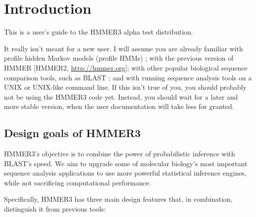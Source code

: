 \section{Introduction}

This is a user's guide to the HMMER3 alpha test distribution. 

It really isn't meant for a new user. I will assume you are already
familiar with profile hidden Markov models (profile HMMs)
\citep{Krogh94,Eddy98,Durbin98}; with the previous version of HMMER
[HMMER2, \url{http://hmmer.org}]; with other popular biological
sequence comparison tools, such as BLAST \citep{Altschul97}; and with
running sequence analysis tools on a UNIX or UNIX-like command
line. If this isn't true of you, you should probably not be using the
HMMER3 code yet. Instead, you should wait for a later and more stable
version, when the user documentation will take less for granted.

\subsection{Design goals of HMMER3}

HMMER3's objective is to combine the power of probabilistic inference
with BLAST's speed. We aim to upgrade some of molecular biology's most
important sequence analysis applications to use more powerful
statistical inference engines, while not sacrificing computational
performance.

Specifically, HMMER3 has three main design features that, in
combination, distinguish it from previous tools:

